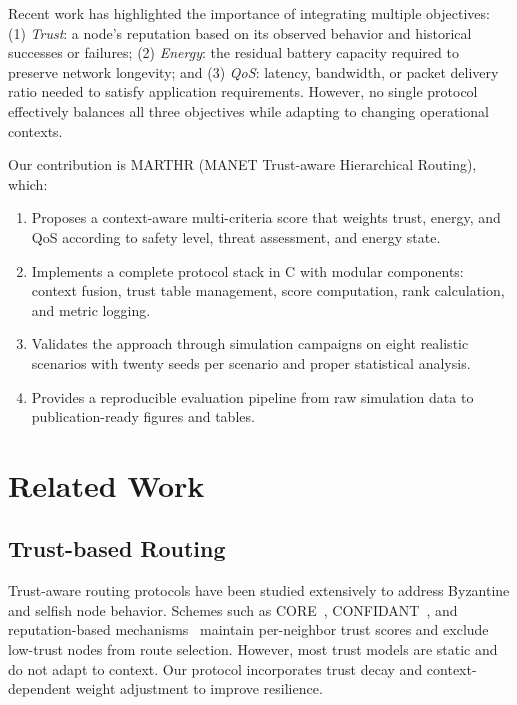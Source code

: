 \documentclass[conference]{IEEEtran}
\begin{document}
Recent work has highlighted the importance of integrating multiple objectives: (1) \emph{Trust}: a node's reputation based on its observed behavior and historical successes or failures; (2) \emph{Energy}: the residual battery capacity required to preserve network longevity; and (3) \emph{QoS}: latency, bandwidth, or packet delivery ratio needed to satisfy application requirements. However, no single protocol effectively balances all three objectives while adapting to changing operational contexts.

Our contribution is MARTHR (MANET Trust-aware Hierarchical Routing), which:
\begin{enumerate}
\item Proposes a context-aware multi-criteria score that weights trust, energy, and QoS according to safety level, threat assessment, and energy state.
\item Implements a complete protocol stack in C with modular components: context fusion, trust table management, score computation, rank calculation, and metric logging.
\item Validates the approach through simulation campaigns on eight realistic scenarios with twenty seeds per scenario and proper statistical analysis.
\item Provides a reproducible evaluation pipeline from raw simulation data to publication-ready figures and tables.
\end{enumerate}

\section{Related Work}

\subsection{Trust-based Routing}
Trust-aware routing protocols have been studied extensively to address Byzantine and selfish node behavior. Schemes such as CORE~\cite{michiardi2002core}, CONFIDANT~\cite{buchegger2002confidant}, and reputation-based mechanisms~\cite{sun2006trust,pirzada2004trust} maintain per-neighbor trust scores and exclude low-trust nodes from route selection. However, most trust models are static and do not adapt to context. Our protocol incorporates trust decay and context-dependent weight adjustment to improve resilience.
\end{document}

